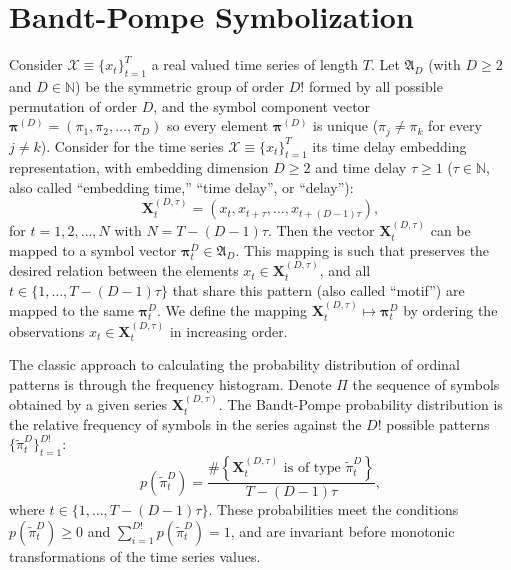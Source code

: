 \documentclass[a4,11pt]{pssbmac}
\begin{document}
\section{Bandt-Pompe Symbolization}\label{BP}

Consider ${\mathcal X} \equiv \{x_t\}_{t=1}^{T}$ a real valued time series of length $T$. 
Let ${\mathfrak A}_{D}$ (with $D \geq 2$ and $D \in {\mathbb  N}$) be the symmetric group of order $D!$ formed by all 
possible permutation of order $D$, and the symbol component vector 
${\bm \pi}^{(D)} = (\pi_1, \pi_2, \dots, \pi_D)$ so every element ${\bm \pi}^{(D)}$ is unique 
($\pi_j \neq \pi_k$ for every $j \neq k$). 
Consider for the time series ${\mathcal X} \equiv \{x_t\}_{t=1}^{T}$ its time delay embedding representation,
with embedding dimension $D \geq 2$ and time delay $\tau \geq 1$ ($\tau \in {\mathbb  N}$, also called ``embedding time,'' ``time delay'', or ``delay''):
\begin{equation} 
\label{eq:time-delay}
{\mathbf X}^{(D,\tau)}_t =( x_t,x_{t+\tau},\dots,x_{t+(D-1)\tau} ) ,
\end{equation} 
for $t = 1,2,\dots,N$ with $N = T-(D-1) \tau$.
Then the vector ${\mathbf X}^{(D,\tau)}_t$ can be mapped to a symbol vector ${\bm \pi}_t^D \in {\mathfrak A}_{D}$. 
This mapping is such that preserves the desired relation between the elements 
$x_t  \in {\mathbf X}^{(D,\tau)}_t$, and all $t \in \{1,\dots,T-(D-1)\tau\}$ that share this pattern (also called ``motif'') are mapped to the same 
${\bm \pi}_t^{D}$.
We define the mapping ${\mathbf X}_t^{(D,\tau)} \mapsto {\mathbf \pi}_t^{D}$ by ordering the observations $x_t \in {\mathbf X}_t^{(D,\tau)}$ in increasing order.

The classic approach to calculating the probability distribution of ordinal patterns is through the frequency histogram.
Denote $\Pi$ the sequence of symbols obtained by a given series $\mathbf{X}_t^{(D,\tau)}$.
The Bandt-Pompe probability distribution is the relative frequency of symbols in the series against the $D!$ possible patterns $\{\widetilde\pi_t^D \}_{t = 1}^{D!}$:
\begin{equation}
p(\widetilde\pi_t^D) = \frac{\#\left \{\mathbf{X}_t^{(D,\tau)} \text{ is of type } \widetilde\pi_t^D\right \}}{T- (D-1)\tau},  
\end{equation}
where  $t\in \{1, \dots, T-(D-1)\tau\}$.
These probabilities meet the conditions $p(\widetilde\pi_t^D) \ge 0$ and  $\sum_{i=1}^{D!} p(\widetilde\pi_t^D) = 1$, and are invariant before monotonic transformations of the time series values.
\end{document}
